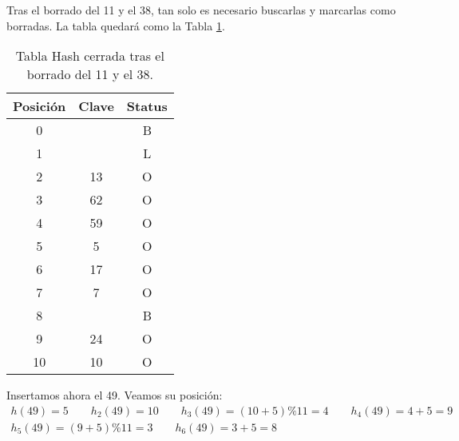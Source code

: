 \begin{ejercicio}
\begin{enumerate}
        Tras el borrado del 11 y el 38, tan solo es necesario buscarlas y marcarlas como borradas. La tabla quedará como la Tabla \ref{fig:HashTrasBorrado}.
        \begin{table}
            \centering
            \begin{tabular}{c|c|c}
            Posición & Clave & Status \\ \hline \hline
            0        &          & B      \\
            1        &          & L      \\
            2        & 13       & O      \\
            3        & 62       & O      \\
            4        & 59       & O      \\
            5        & 5        & O      \\
            6        & 17       & O      \\
            7        & 7        & O      \\
            8        &          & B      \\
            9        & 24       & O      \\
            10       & 10       & O     
            \end{tabular}
            \caption{Tabla Hash cerrada tras el borrado del 11 y el 38.}
            \label{fig:HashTrasBorrado}
        \end{table}

        Insertamos ahora el 49. Veamos su posición:
        \begin{gather*}
            h(49)=5 \qquad h_2(49)=10 \qquad h_3(49)=(10+5)\%11=4
            \qquad h_4(49)=4+5=9 \\ h_5(49)=(9+5)\%11=3
            \qquad h_6(49)=3+5=8
        \end{gather*}


\end{enumerate}
\end{ejercicio}
